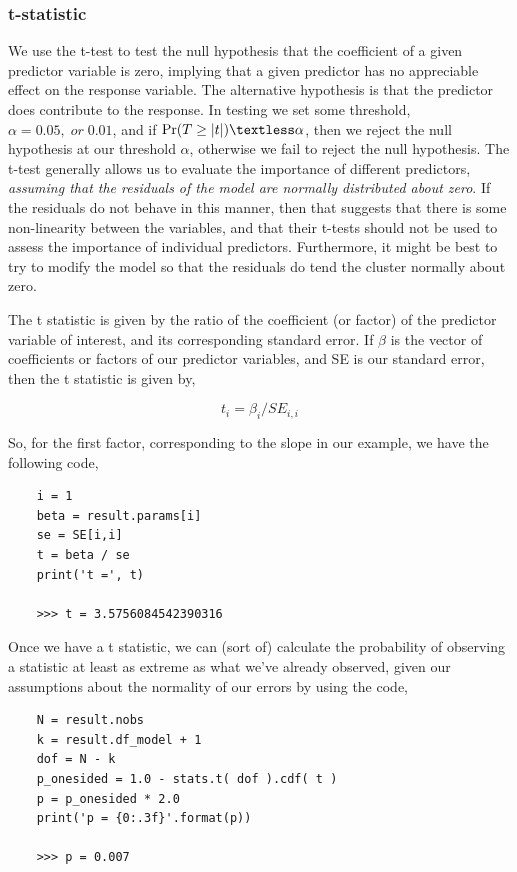 \subsubsection{t-statistic}

We use the t-test to test the null hypothesis that the coefficient of a given predictor variable is zero, implying that a given predictor has no appreciable effect on the response variable. The alternative hypothesis is that the predictor does contribute to the response. In testing we set some threshold, $\alpha = 0.05,\;or\; 0.01$, and if $\Pr(T \ge \vert t \vert) \textless \alpha$, then we reject the null hypothesis at our threshold $\alpha$, otherwise we fail to reject the null hypothesis. The t-test generally allows us to evaluate the importance of different predictors, \emph{assuming that the residuals of the model are normally distributed about zero}. If the residuals do not behave in this manner, then that suggests that there is some non-linearity between the variables, and that their t-tests should not be used to assess the importance of individual predictors. Furthermore, it might be best to try to modify the model so that the residuals do tend the cluster normally about zero.

The t statistic is given by the ratio of the coefficient (or factor) of the predictor variable of interest, and its corresponding standard error. If $\beta$ is the vector of coefficients or factors of our predictor variables, and SE is our standard error, then the t statistic is given by,

\begin{equation}
    t_{i} = \beta_{i} / SE_{i,i}
\end{equation}

So, for the first factor, corresponding to the slope in our example, we have the following code,

\begin{lstlisting}
    i = 1
    beta = result.params[i]
    se = SE[i,i]
    t = beta / se
    print('t =', t)

    >>> t = 3.5756084542390316
\end{lstlisting}

Once we have a t statistic, we can (sort of) calculate the probability of observing a statistic at least as extreme as what we’ve already observed, given our assumptions about the normality of our errors by using the code,

\begin{lstlisting}
    N = result.nobs
    k = result.df_model + 1
    dof = N - k
    p_onesided = 1.0 - stats.t( dof ).cdf( t )
    p = p_onesided * 2.0
    print('p = {0:.3f}'.format(p))

    >>> p = 0.007
\end{lstlisting}

